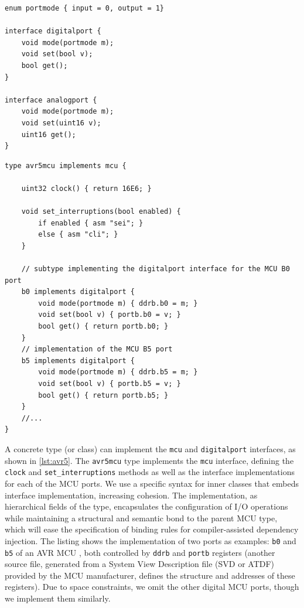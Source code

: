\documentclass[10pt,sigplan,screen,anonymous]{acmart}
\begin{document}
\begin{lstlisting}[caption=Interfaces for digital and analog ports, label=lst:iports]
enum portmode { input = 0, output = 1}

interface digitalport {
	void mode(portmode m);
	void set(bool v);
	bool get();
}

interface analogport {
	void mode(portmode m);
	void set(uint16 v);
	uint16 get();
}
\end{lstlisting}







\begin{lstlisting}[float=bp, caption=AVR MCU partial implementation, label=lst:avr5]
type avr5mcu implements mcu {

	uint32 clock() { return 16E6; }

	void set_interruptions(bool enabled) {
		if enabled { asm "sei"; }
		else { asm "cli"; }
	}

	// subtype implementing the digitalport interface for the MCU B0 port
	b0 implements digitalport {
		void mode(portmode m) { ddrb.b0 = m; }
		void set(bool v) { portb.b0 = v; }
		bool get() { return portb.b0; }
	}
	// implementation of the MCU B5 port
	b5 implements digitalport {
		void mode(portmode m) { ddrb.b5 = m; }
		void set(bool v) { portb.b5 = v; }
		bool get() { return portb.b5; }
	}
	//...
}
\end{lstlisting}


A concrete type (or class) can implement the {\tt mcu} and {\tt digitalport} interfaces, as shown in \autoref{lst:avr5}. The {\tt avr5mcu} type implements the {\tt mcu} interface, defining the {\tt clock} and {\tt set\_interruptions} methods as well as the interface implementations for each of the MCU ports. We use a specific syntax for inner classes that embeds interface implementation, increasing cohesion. The implementation, as hierarchical fields of the type, encapsulates the configuration of I/O operations while maintaining a structural and semantic bond to the parent MCU type, which will ease the specification of binding rules for compiler-assisted dependency injection. The listing shows the implementation of two ports as examples: {\tt b0} and {\tt b5} of an AVR MCU \cite{atmel328p}, both controlled by {\tt ddrb} and {\tt portb} registers (another source file, generated from a System View Description file (SVD or ATDF) provided by the MCU manufacturer, defines the structure and addresses of these registers). Due to space constraints, we omit the other digital MCU ports, though we implement them similarly. 
\end{document}
